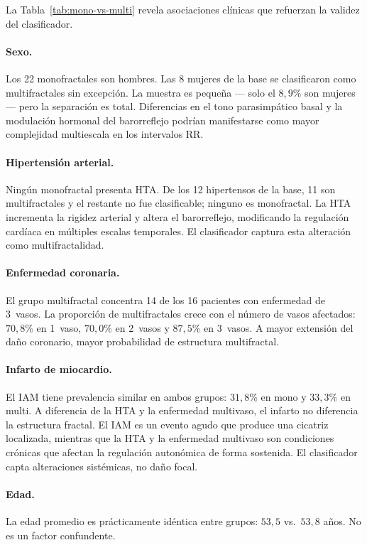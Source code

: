 La Tabla~\ref{tab:mono-vs-multi} revela asociaciones clínicas que refuerzan
la validez del clasificador.

\paragraph{Sexo.}
Los 22 monofractales son hombres. Las 8 mujeres de la base se clasificaron
como multifractales sin excepción. La muestra es pequeña --- solo el
$8{,}9\%$ son mujeres --- pero la separación es total. Diferencias en el
tono parasimpático basal y la modulación hormonal del barorreflejo podrían
manifestarse como mayor complejidad multiescala en los intervalos RR.

\paragraph{Hipertensión arterial.}
Ningún monofractal presenta HTA. De los 12 hipertensos de la base, 11 son
multifractales y el restante no fue clasificable; ninguno es monofractal.
La HTA incrementa la rigidez arterial y altera el barorreflejo, modificando
la regulación cardíaca en múltiples escalas temporales. El clasificador
captura esta alteración como multifractalidad.

\paragraph{Enfermedad coronaria.}
El grupo multifractal concentra 14 de los 16 pacientes con enfermedad de
3~vasos. La proporción de multifractales crece con el número de vasos
afectados: $70{,}8\%$ en 1~vaso, $70{,}0\%$ en 2~vasos y $87{,}5\%$ en
3~vasos. A mayor extensión del daño coronario, mayor probabilidad de
estructura multifractal.

\paragraph{Infarto de miocardio.}
El IAM tiene prevalencia similar en ambos grupos: $31{,}8\%$ en mono y
$33{,}3\%$ en multi. A diferencia de la HTA y la enfermedad multivaso, el
infarto no diferencia la estructura fractal. El IAM es un evento agudo que
produce una cicatriz localizada, mientras que la HTA y la enfermedad
multivaso son condiciones crónicas que afectan la regulación autonómica de
forma sostenida. El clasificador capta alteraciones sistémicas, no daño
focal.

\paragraph{Edad.}
La edad promedio es prácticamente idéntica entre grupos: $53{,}5$ vs.\
$53{,}8$ años. No es un factor confundente.
